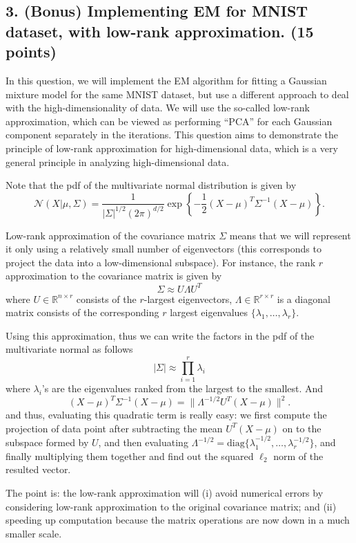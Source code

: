 \documentclass[twoside,12pt]{article}
\begin{document}
\subsection*{3. (Bonus) Implementing EM for MNIST dataset, with low-rank approximation. (15 points)}

In this question, we will implement the EM algorithm for fitting a Gaussian mixture model for the same MNIST dataset, but use a different approach to deal with the high-dimensionality of data. We will use the so-called low-rank approximation, which can be viewed as performing ``PCA'' for each Gaussian component separately in the iterations. This question aims to demonstrate the principle of low-rank approximation for high-dimensional data, which is a very general principle in analyzing high-dimensional data.  

Note that the pdf of the multivariate normal distribution is given by
\[
\mathcal N(X|\mu, \Sigma) = \frac{1}{|\Sigma|^{1/2} (2\pi)^{d/2}} 
\exp\left\{- \frac 1 2 (X-\mu)^T \Sigma^{-1}(X-\mu) \right\}.
\]

Low-rank approximation of the covariance matrix $\Sigma$ means that we will represent it only using a relatively small number of eigenvectors (this corresponds to project the data into a low-dimensional subspace). For instance, the rank $r$ approximation to the covariance matrix is given by
\[
\Sigma \approx U \Lambda U^T
\]
where $U \in \mathbb R^{n\times r}$ consists of the $r$-largest eigenvectors, $\Lambda \in \mathbb R^{r\times r}$ is a diagonal matrix consists of the corresponding $r$ largest eigenvalues $\{\lambda_1, \ldots, \lambda_r\}$. 

Using this approximation, thus we can write the factors in the pdf of the multivariate normal as follows
\[
|\Sigma| \approx \prod_{i=1}^r \lambda_i \]
where $\lambda_i$'s are the eigenvalues ranked from the largest to the smallest. And 
\[
(X-\mu)^T \Sigma^{-1}(X-\mu) = \|\Lambda^{-1/2}U^T (X-\mu) \|^2.
\]
and thus, evaluating this quadratic term is really easy: we first compute the projection of data point after subtracting the mean $U^T (X-\mu)$ on to the subspace formed by $U$, and then evaluating $\Lambda^{-1/2} = \mbox{diag}\{\lambda_1^{-1/2}, \ldots, \lambda_r^{-1/2}\}$, and finally multiplying them together and find out the squared $\ell_2$ norm of the resulted vector. 

The point is: the low-rank approximation will (i) avoid numerical errors by considering low-rank approximation to the original covariance matrix; and (ii) speeding up computation because the matrix operations are now down in a much smaller scale. 
\end{document}
